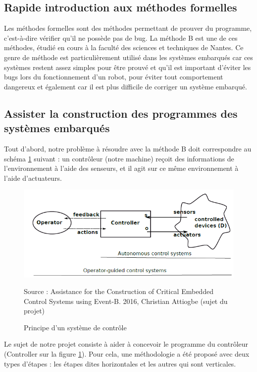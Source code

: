 \documentclass{article}
\begin{document}
\subsection{Rapide introduction aux méthodes formelles}

    Les méthodes formelles sont des méthodes permettant de prouver du programme, c'est-à-dire vérifier qu'il ne possède pas de bug. La méthode B est une de ces méthodes, étudié en cours à la faculté des sciences et techniques de Nantes. Ce genre de méthode est particulièrement utilisé dans les systèmes embarqués car ces systèmes restent assez simples pour être prouvé et qu'il est important d'éviter les bugs lors du fonctionnement d'un robot, pour éviter tout comportement dangereux et également car il est plus difficile de corriger un système embarqué.
    
\subsection{Assister la construction des programmes des systèmes embarqués}
    Tout d’abord, notre problème à résoudre avec la méthode B doit correspondre au schéma \ref{fig:ctrl} suivant  : un contrôleur (notre machine) reçoit des informations de l’environnement à l’aide des senseurs, et il agit sur ce même environnement à l’aide d’actuateurs. 
    
    \begin{figure}[ht]
        \centering
        \includegraphics[width=\textwidth]{controller.png}
        \caption{Principe d'un système de contrôle}
        Source : Assistance for the Construction of Critical Embedded Control Systems using Event-B. 2016, Christian Attiogbe (sujet du projet)
        \label{fig:ctrl}
    \end{figure}
    
    Le sujet de notre projet consiste à aider à concevoir le programme du contrôleur (Controller sur la figure \ref{fig:ctrl}). Pour cela, une méthodologie a été proposé avec deux types d'étapes : les étapes dites horizontales et les autres qui sont verticales.
    
\end{document}
